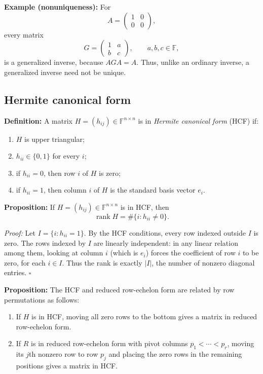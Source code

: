 \documentclass[a4paper,11pt,abstract=true]{scrartcl}
\theoremstyle{dotlessP}
\theoremstyle{dotlessS}
\theoremstyle{remark}
\theoremstyle{definition}
\begin{document}
\begin{example_box}
\textbf{Example (nonuniqueness):} For
\[
A=\begin{pmatrix}1&0\\0&0\end{pmatrix},
\]
every matrix
\[
G=\begin{pmatrix}1&a\\b&c\end{pmatrix},\qquad a,b,c\in\mathbb{F},
\]
is a generalized inverse, because $AGA=A$. Thus, unlike an ordinary
inverse, a generalized inverse need not be unique.
\end{example_box}

\subsection{Hermite canonical form}

\begin{definition_box}
\textbf{Definition:} A matrix $H=(h_{ij})\in\mathbb{F}^{n\times n}$
is in \emph{Hermite canonical form} (HCF) if:
\begin{enumerate}
    \item $H$ is upper triangular;
    \item $h_{ii}\in\{0,1\}$ for every $i$;
    \item if $h_{ii}=0$, then row $i$ of $H$ is zero;
    \item if $h_{ii}=1$, then column $i$ of $H$ is the standard basis
    vector $e_i$.
\end{enumerate}
\end{definition_box}

\begin{problem_box}
\textbf{Proposition:} If $H=(h_{ij})\in\mathbb{F}^{n\times n}$ is in
HCF, then
\[
\operatorname{rank}H=\#\{i:h_{ii}\neq0\}.
\]
\end{problem_box}

\begin{claim_box}
\textit{Proof:} Let $I=\{i:h_{ii}=1\}$. By the HCF conditions,
every row indexed outside $I$ is zero. The rows indexed by $I$ are
linearly independent: in any linear relation among them, looking at
column $i$ (which is $e_i$) forces the coefficient of row $i$ to be
zero, for each $i\in I$. Thus the rank is exactly $|I|$, the number
of nonzero diagonal entries. \hfill$\square$
\end{claim_box}

\begin{problem_box}
\textbf{Proposition:} The HCF and reduced row-echelon form are related
by row permutations as follows:
\begin{enumerate}
    \item If $H$ is in HCF, moving all zero rows to the bottom gives a
    matrix in reduced row-echelon form.
    \item If $R$ is in reduced row-echelon form with pivot columns
    $p_1<\cdots<p_r$, moving its $j$th nonzero row to row $p_j$ and
    placing the zero rows in the remaining positions gives a matrix in
    HCF.
\end{enumerate}
\end{problem_box}
\end{document}
